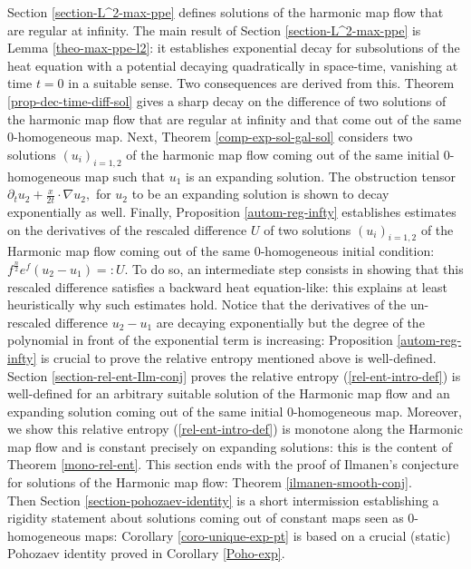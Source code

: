 \documentclass[a4paper,11pt,reqno]{amsart}
\begin{document}
Section \ref{section-L^2-max-ppe} defines solutions of the harmonic map flow that are regular at infinity.
The main result of Section \ref{section-L^2-max-ppe} is Lemma \ref{theo-max-ppe-l2}: it establishes exponential decay for subsolutions of  the heat equation with a potential decaying quadratically in space-time, vanishing at time $t=0$ in a suitable sense. Two consequences are derived from this. Theorem \ref{prop-dec-time-diff-sol} gives a sharp decay on the difference of two solutions of the harmonic map flow that are regular at infinity and that come out of the same $0$-homogeneous map. Next, Theorem \ref{comp-exp-sol-gal-sol} considers two solutions $(u_i)_{i=1,2}$ of the harmonic map flow coming out of the same initial $0$-homogeneous map such that $u_1$ is an expanding solution. The obstruction tensor $\partial_tu_2+\frac{x}{2t}\cdot\nabla u_2,$ for $u_2$ to be an expanding solution is shown to decay exponentially as well. Finally, Proposition \ref{autom-reg-infty} establishes estimates on the derivatives of the rescaled difference $U$ of two solutions $(u_i)_{i=1,2}$ of the Harmonic map flow coming out of the same $0$-homogeneous initial condition:
$f^{\frac{n}{2}}e^f(u_2-u_1)=:U.$ To do so, an intermediate step consists in showing that this rescaled difference satisfies a backward heat equation-like: this explains at least heuristically why such estimates hold. Notice that the derivatives of the un-rescaled difference $u_2-u_1$ are decaying exponentially but the degree of the polynomial in front of the exponential term is increasing: Proposition \ref{autom-reg-infty} is crucial to prove the relative entropy mentioned above is well-defined.\\

Section \ref{section-rel-ent-Ilm-conj} proves the relative entropy (\ref{rel-ent-intro-def})  is well-defined for an arbitrary suitable solution of the Harmonic map flow and an expanding solution coming out of the same initial $0$-homogeneous map. Moreover, we show this relative entropy (\ref{rel-ent-intro-def})  is monotone along the Harmonic map flow and is constant precisely on expanding solutions: this is the content of Theorem \ref{mono-rel-ent}. This section ends with the proof of Ilmanen's conjecture for solutions of the Harmonic map flow: Theorem \ref{ilmanen-smooth-conj}.\\

Then Section \ref{section-pohozaev-identity} is a short intermission establishing a rigidity statement about solutions coming out of constant maps seen as $0$-homogeneous maps: Corollary \ref{coro-unique-exp-pt} is based on a crucial (static) Pohozaev identity proved in Corollary \ref{Poho-exp}.\\
\end{document}

